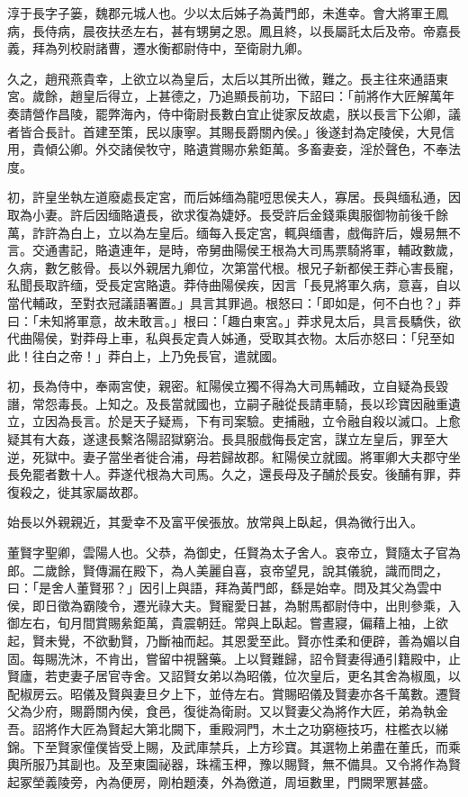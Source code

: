 \begin{pinyinscope}
淳于長字子篓，魏郡元城人也。少以太后姊子為黃門郎，未進幸。會大將軍王鳳病，長侍病，晨夜扶丞左右，甚有甥舅之恩。鳳且終，以長屬託太后及帝。帝嘉長義，拜為列校尉諸曹，遷水衡都尉侍中，至衛尉九卿。

久之，趙飛燕貴幸，上欲立以為皇后，太后以其所出微，難之。長主往來通語東宮。歲餘，趙皇后得立，上甚德之，乃追顯長前功，下詔曰：「前將作大匠解萬年奏請營作昌陵，罷弊海內，侍中衛尉長數白宜止徙家反故處，朕以長言下公卿，議者皆合長計。首建至策，民以康寧。其賜長爵關內侯。」後遂封為定陵侯，大見信用，貴傾公卿。外交諸侯牧守，賂遺賞賜亦絫鉅萬。多畜妻妾，淫於聲色，不奉法度。

初，許皇坐執左道廢處長定宮，而后姊缅為龍哣思侯夫人，寡居。長與缅私通，因取為小妻。許后因缅賂遺長，欲求復為婕妤。長受許后金錢乘輿服御物前後千餘萬，詐許為白上，立以為左皇后。缅每入長定宮，輒與缅書，戲侮許后，嫚易無不言。交通書記，賂遺連年，是時，帝舅曲陽侯王根為大司馬票騎將軍，輔政數歲，久病，數乞骸骨。長以外親居九卿位，次第當代根。根兄子新都侯王莽心害長寵，私聞長取許缅，受長定宮賂遺。莽侍曲陽侯疾，因言「長見將軍久病，意喜，自以當代輔政，至對衣冠議語署置。」具言其罪過。根怒曰：「即如是，何不白也？」莽曰：「未知將軍意，故未敢言。」根曰：「趣白東宮。」莽求見太后，具言長驕佚，欲代曲陽侯，對莽母上車，私與長定貴人姊通，受取其衣物。太后亦怒曰：「兒至如此！往白之帝！」莽白上，上乃免長官，遣就國。

初，長為侍中，奉兩宮使，親密。紅陽侯立獨不得為大司馬輔政，立自疑為長毀譖，常怨毒長。上知之。及長當就國也，立嗣子融從長請車騎，長以珍寶因融重遺立，立因為長言。於是天子疑焉，下有司案驗。吏捕融，立令融自殺以滅口。上愈疑其有大姦，遂逮長繫洛陽詔獄窮治。長具服戲侮長定宮，謀立左皇后，罪至大逆，死獄中。妻子當坐者徙合浦，母若歸故郡。紅陽侯立就國。將軍卿大夫郡守坐長免罷者數十人。莽遂代根為大司馬。久之，還長母及子酺於長安。後酺有罪，莽復殺之，徙其家屬故郡。

始長以外親親近，其愛幸不及富平侯張放。放常與上臥起，俱為微行出入。

董賢字聖卿，雲陽人也。父恭，為御史，任賢為太子舍人。哀帝立，賢隨太子官為郎。二歲餘，賢傳漏在殿下，為人美麗自喜，哀帝望見，說其儀貌，識而問之，曰：「是舍人董賢邪？」因引上與語，拜為黃門郎，繇是始幸。問及其父為雲中侯，即日徵為霸陵令，遷光祿大夫。賢寵愛日甚，為駙馬都尉侍中，出則參乘，入御左右，旬月間賞賜絫鉅萬，貴震朝廷。常與上臥起。嘗晝寢，偏藉上袖，上欲起，賢未覺，不欲動賢，乃斷袖而起。其恩愛至此。賢亦性柔和便辟，善為媚以自固。每賜洗沐，不肯出，嘗留中視醫藥。上以賢難歸，詔令賢妻得通引籍殿中，止賢廬，若吏妻子居官寺舍。又詔賢女弟以為昭儀，位次皇后，更名其舍為椒風，以配椒房云。昭儀及賢與妻旦夕上下，並侍左右。賞賜昭儀及賢妻亦各千萬數。遷賢父為少府，賜爵關內侯，食邑，復徙為衛尉。又以賢妻父為將作大匠，弟為執金吾。詔將作大匠為賢起大第北闕下，重殿洞門，木土之功窮極技巧，柱檻衣以綈錦。下至賢家僮僕皆受上賜，及武庫禁兵，上方珍寶。其選物上弟盡在董氏，而乘輿所服乃其副也。及至東園祕器，珠襦玉柙，豫以賜賢，無不備具。又令將作為賢起冢塋義陵旁，內為便房，剛柏題湊，外為徼道，周垣數里，門闕罘罳甚盛。


\end{pinyinscope}

